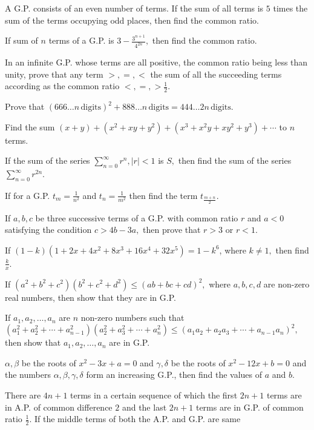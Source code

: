 \item A G.P. consists of an even number of terms. If the sum of all terms is $5$ times the sum of the terms occupying odd
  places, then find the common ratio.
\item If sum of $n$ terms of a G.P. is $3 - \frac{3^{n + 1}}{4^{2n}},$ then find the common ratio.
\item In an infinite G.P. whose terms are all positive, the common ratio being less than unity, prove that any term $>, =,
  <$ the sum of all the succeeding terms according as the common ratio $<, =, > \frac{1}{2}$.
\item Prove that $(666\ldots n\,\text{digits})^2 + 888\ldots n\,\text{digits} = 444\ldots 2n\,\text{digits}$.
\item Find the sum $(x + y) + (x^2 + xy + y^2) + (x^3 + x^2y + xy^2 + y^3) + \cdots$ to $n$ terms.
\item If the sum of the series $\displaystyle\sum_{n = 0}^\infty r^n, |r| < 1$ is $S,$ then find the sum of the series $\displaystyle\sum_{n=0}^\infty
  r^{2n}$.
\item If for a G.P. $t_m = \frac{1}{n^2}$ and $t_n = \frac{1}{m^2}$ then find the term $t_{\tfrac{m + n}{2}}$.
\item If $a, b, c$ be three successive terms of a G.P. with common ratio $r$ and $a < 0$ satisfying the condition $c > 4b
  - 3a,$ then prove that $r > 3$ or $r < 1$.
\item If $(1 - k)(1 + 2x + 4x^2 + 8x^3 + 16x^4 + 32x^5) = 1 - k^6$, where $k \neq 1,$ then find $\frac{k}{x}$.
\item If $(a^2 + b^2 + c^2)(b^2 + c^2 + d^2) \leq (ab + bc + cd)^2,$ where $a, b, c, d$ are non-zero real numbers, then
  show that they are in G.P.
\item If $a_1, a_2, \ldots, a_n$ are $n$ non-zero numbers such that $(a_1^2 + a_2^2 + \cdots + a_{n - 1}^2)(a_2^2 + a_3^2
  + \cdots + a_n^2) \leq (a_1a_2 + a_2a_3 + \cdots + a_{n - 1}a_n)^2,$ then show that $a_1, a_2, \ldots, a_n$ are in G.P.
\item $\alpha, \beta$ be the roots of $x^2 - 3x + a = 0$ and $\gamma, \delta$ be the roots of $x^2 - 12x + b = 0$ and the
  numbers $\alpha, \beta, \gamma, \delta$ form an increasing G.P., then find the values of $a$ and $b$.
\item There are $4n + 1$ terms in a certain sequence of which the first $2n + 1$ terms are in A.P. of common difference
  $2$ and the last $2n + 1$ terms are in G.P. of common ratio $\frac{1}{2}.$ If the middle terms of both the A.P. and G.P. are same
